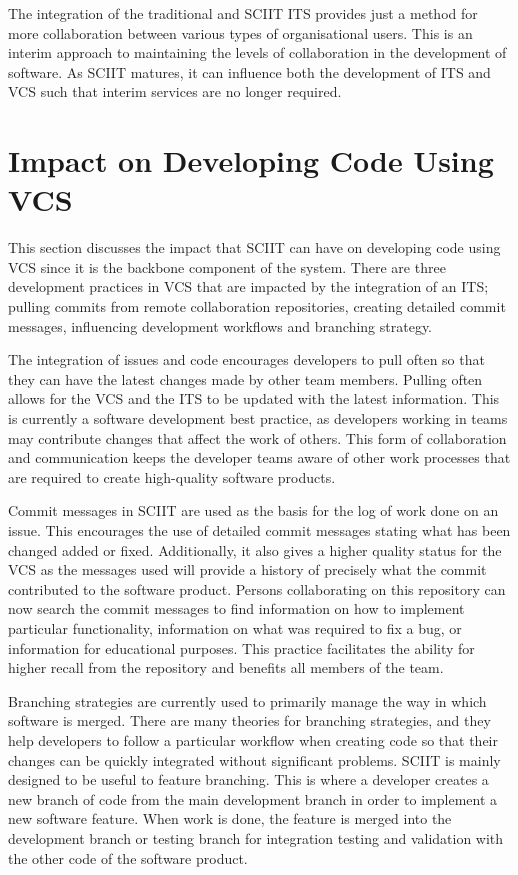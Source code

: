 \documentclass{mproj}
\begin{document}
The integration of the traditional and SCIIT ITS provides just a method for more collaboration between various types of organisational users. This is an interim approach to maintaining the levels of collaboration in the development of software. As SCIIT matures, it can influence both the development of ITS and VCS such that interim services are no longer required.

\section{Impact on Developing Code Using VCS}

This section discusses the impact that SCIIT can have on developing code using VCS since it is the backbone component of the system. There are three development practices in VCS that are impacted by the integration of an ITS; pulling commits from remote collaboration repositories, creating detailed commit messages, influencing development workflows and branching strategy.

The integration of issues and code encourages developers to pull often so that they can have the latest changes made by other team members. Pulling often allows for the VCS and the ITS to be updated with the latest information. This is currently a software development best practice, as developers working in teams may contribute changes that affect the work of others. This form of collaboration and communication keeps the developer teams aware of other work processes that are required to create high-quality software products.

Commit messages in SCIIT are used as the basis for the log of work done on an issue. This encourages the use of detailed commit messages stating what has been changed added or fixed. Additionally, it also gives a higher quality status for the VCS as the messages used will provide a history of precisely what the commit contributed to the software product. Persons collaborating on this repository can now search the commit messages to find information on how to implement particular functionality, information on what was required to fix a bug, or information for educational purposes. This practice facilitates the ability for higher recall from the repository and benefits all members of the team.

Branching strategies are currently used to primarily manage the way in which software is merged. There are many theories for branching strategies, and they help developers to follow a particular workflow when creating code so that their changes can be quickly integrated without significant problems. SCIIT is mainly designed to be useful to feature branching. This is where a developer creates a new branch of code from the main development branch in order to implement a new software feature. When work is done, the feature is merged into the development branch or testing branch for integration testing and validation with the other code of the software product.
\end{document}
